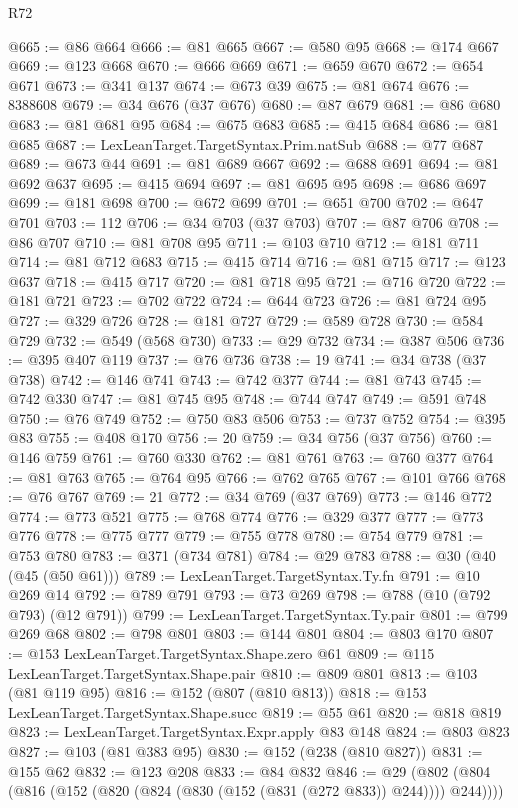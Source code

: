 \begin{lexlean}{R72}
\begin{coremodule}
@665 := @86 @664
@666 := @81 @665
@667 := @580 @95
@668 := @174 @667
@669 := @123 @668
@670 := @666 @669
@671 := @659 @670
@672 := @654 @671
@673 := @341 @137
@674 := @673 @39
@675 := @81 @674
@676 := 8388608
@679 := @34 @676 (@37 @676)
@680 := @87 @679
@681 := @86 @680
@683 := @81 @681 @95
@684 := @675 @683
@685 := @415 @684
@686 := @81 @685
@687 := LexLeanTarget.TargetSyntax.Prim.natSub
@688 := @77 @687
@689 := @673 @44
@691 := @81 @689 @667
@692 := @688 @691
@694 := @81 @692 @637
@695 := @415 @694
@697 := @81 @695 @95
@698 := @686 @697
@699 := @181 @698
@700 := @672 @699
@701 := @651 @700
@702 := @647 @701
@703 := 112
@706 := @34 @703 (@37 @703)
@707 := @87 @706
@708 := @86 @707
@710 := @81 @708 @95
@711 := @103 @710
@712 := @181 @711
@714 := @81 @712 @683
@715 := @415 @714
@716 := @81 @715
@717 := @123 @637
@718 := @415 @717
@720 := @81 @718 @95
@721 := @716 @720
@722 := @181 @721
@723 := @702 @722
@724 := @644 @723
@726 := @81 @724 @95
@727 := @329 @726
@728 := @181 @727
@729 := @589 @728
@730 := @584 @729
@732 := @549 (@568 @730)
@733 := @29 @732
@734 := @387 @506
@736 := @395 @407 @119
@737 := @76 @736
@738 := 19
@741 := @34 @738 (@37 @738)
@742 := @146 @741
@743 := @742 @377
@744 := @81 @743
@745 := @742 @330
@747 := @81 @745 @95
@748 := @744 @747
@749 := @591 @748
@750 := @76 @749
@752 := @750 @83 @506
@753 := @737 @752
@754 := @395 @83
@755 := @408 @170
@756 := 20
@759 := @34 @756 (@37 @756)
@760 := @146 @759
@761 := @760 @330
@762 := @81 @761
@763 := @760 @377
@764 := @81 @763
@765 := @764 @95
@766 := @762 @765
@767 := @101 @766
@768 := @76 @767
@769 := 21
@772 := @34 @769 (@37 @769)
@773 := @146 @772
@774 := @773 @521
@775 := @768 @774
@776 := @329 @377
@777 := @773 @776
@778 := @775 @777
@779 := @755 @778
@780 := @754 @779
@781 := @753 @780
@783 := @371 (@734 @781)
@784 := @29 @783
@788 := @30 (@40 (@45 (@50 @61)))
@789 := LexLeanTarget.TargetSyntax.Ty.fn
@791 := @10 @269 @14
@792 := @789 @791
@793 := @73 @269
@798 := @788 (@10 (@792 @793) (@12 @791))
@799 := LexLeanTarget.TargetSyntax.Ty.pair
@801 := @799 @269 @68
@802 := @798 @801
@803 := @144 @801
@804 := @803 @170
@807 := @153 LexLeanTarget.TargetSyntax.Shape.zero @61
@809 := @115 LexLeanTarget.TargetSyntax.Shape.pair
@810 := @809 @801
@813 := @103 (@81 @119 @95)
@816 := @152 (@807 (@810 @813))
@818 := @153 LexLeanTarget.TargetSyntax.Shape.succ
@819 := @55 @61
@820 := @818 @819
@823 := LexLeanTarget.TargetSyntax.Expr.apply @83 @148
@824 := @803 @823
@827 := @103 (@81 @383 @95)
@830 := @152 (@238 (@810 @827))
@831 := @155 @62
@832 := @123 @208
@833 := @84 @832
@846 := @29 (@802 (@804 (@816 (@152 (@820 (@824 (@830 (@152 (@831 (@272 @833)) @244)))) @244))))

\end{coremodule}
\end{lexlean}
